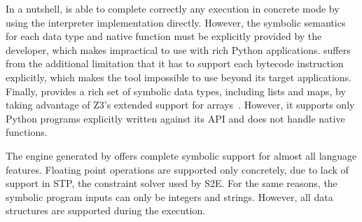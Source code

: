 In a nutshell, \cutiepy is able to complete correctly any execution in concrete mode by using the interpreter implementation directly.   However, the symbolic semantics for each data type and native function must be explicitly provided by the developer, which makes \cutiepy impractical to use with rich Python applications.  \nicese suffers from the additional limitation that it has to support each bytecode instruction explicitly, which makes the tool impossible to use beyond its target applications.  Finally, \commuterse provides a rich set of symbolic data types, including lists and maps, by taking advantage of Z3's extended support for arrays~\cite{general-arrays}.  However, it supports only Python programs explicitly written against its API and does not handle native functions.




The engine generated by \chef offers complete symbolic support for almost all language features.  Floating point operations are supported only concretely, due to lack of support in STP, the constraint solver used by S2E.  For the same reasons, the symbolic program inputs can only be integers and strings.  However, all data structures are supported during the execution.

